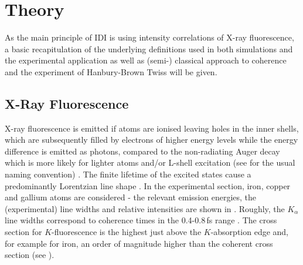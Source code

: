 \chapter{Theory}
\label{chap:theory}
As the main principle of IDI is using intensity correlations of X-ray fluorescence, a basic recapitulation of the underlying definitions used in both simulations and the experimental application as well as (semi-) classical approach to coherence and the experiment of Hanbury-Brown Twiss will be given.


\section{X-Ray Fluorescence}
X-ray fluorescence is emitted if atoms are ionised leaving holes in the inner shells, which are subsequently filled by electrons of higher energy levels while the energy difference is emitted as photons, compared to the non-radiating Auger decay which is more likely for lighter atoms and/or L-shell excitation (see  for the usual naming convention) \cite{santra2009}.  The finite lifetime of the excited states cause a predominantly Lorentzian line shape \cite{attwood1999,van2001}. In the experimental section, iron, copper and gallium atoms are considered - the relevant emission energies, the (experimental) line widths and relative intensities are shown in .   Roughly, the $K_\alpha$ line widths correspond to coherence times in the 0.4-0.8\,fs range \cite{krause1979}. The cross section for $K$-fluorescence is the highest just above the $K$-absorption edge and, for example for iron, an order of magnitude higher than the coherent cross section (see ).

